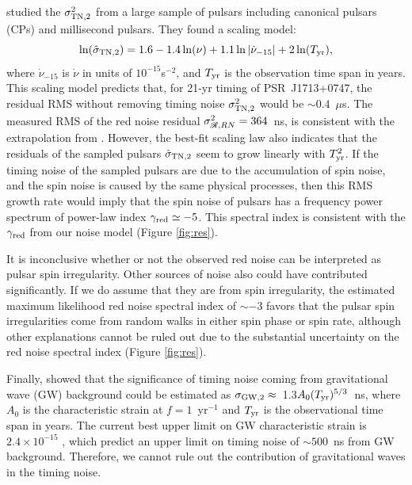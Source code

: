 \citet{sc10} studied the $\sigma^2_{\rm TN,2}$ from a large sample of pulsars
including canonical pulsars (CPs) and millisecond pulsars. They found a scaling
model:
\begin{equation}
\label{eq:sc10}
\ln(\hat{\sigma}_{\rm TN,2}) = 1.6 - 1.4\ln(\nu) +
1.1\ln|\dot{\nu}_{-15}|+2\ln(T_{\rm yr}),
\end{equation}
where $\dot{\nu}_{-15}$ is $\dot{\nu}$ in units of $10^{-15}$s$^{-2}$, and $T_{\rm yr}$
is the observation time span in years.
This scaling model predicts that, for 21-yr timing of PSR~J1713+0747, the
residual RMS without removing timing noise $\sigma^2_{\rm TN,2}$ would be
$\sim0.4$~$\mu $s. The measured RMS of the red noise residual 
$\sigma^2_{\mathscr{R},RN}=364$~ns, is consistent with the extrapolation
from \citet{sc10}.  
However, the best-fit scaling law also indicates that the residuals of the
sampled pulsars $\hat{\sigma}_{\rm TN,2}$ seem to grow linearly with $T_{\rm yr}^2$. 
If the timing noise of the sampled pulsars are due to the accumulation of 
spin noise, and the spin noise is caused by the same physical processes,
then this RMS growth rate would imply that the spin noise of pulsars has a
frequency power spectrum of power-law index $\gamma_{\rm red}\simeq-5$. This 
spectral index is consistent with the $\gamma_{\rm red}$
from our noise model (Figure \ref{fig:res}).

It is inconclusive whether or not the observed red noise can be interpreted as pulsar spin irregularity.
Other sources of noise also could have contributed significantly.
If we do assume that they are from spin irregularity, 
the estimated maximum likelihood red noise spectral index of $\sim-3$ 
favors that the pulsar spin irregularities come from
random walks in either spin phase or spin rate, although other explanations cannot be ruled out due to the
substantial uncertainty on the red noise spectral index (Figure \ref{fig:res}).

Finally, \citet{sc10} showed that the significance of timing noise coming from
gravitational wave (GW) background could be estimated as
$\sigma_{\rm GW,2} \approx$~1.3$A_0(T_{\rm yr})^{5/3}$~ns, where $A_0$ is the
characteristic strain at $f=1$~yr$^{-1}$ and $T_{\rm yr}$ is the observational
time span in years. The current best upper limit on GW characteristic 
strain is $2.4\times10^{-15}$ \citep{src+13}, which predict an upper limit on
timing noise of $\sim500$~ns from GW background. Therefore, we
cannot rule out the contribution of gravitational waves in the timing noise.


